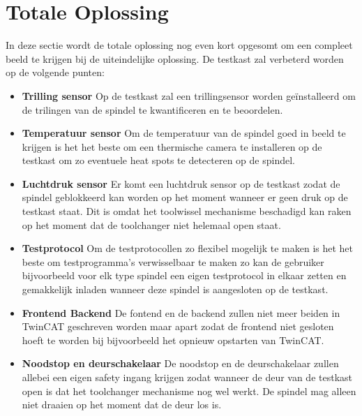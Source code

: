 \section{Totale Oplossing}

In deze sectie wordt de totale oplossing nog even kort opgesomt om een compleet beeld te krijgen bij de uiteindelijke oplossing. De testkast zal verbeterd worden op de volgende punten:

\begin{itemize}
	\item \textbf{Trilling sensor} Op de testkast zal een trillingsensor worden geïnstalleerd om de trilingen van de spindel te kwantificeren en te beoordelen.
	
	\item \textbf{Temperatuur sensor} Om de temperatuur van de spindel goed in beeld te krijgen is het het beste om een thermische camera te installeren op de testkast om zo eventuele heat spots te detecteren op de spindel.
	
	\item \textbf{Luchtdruk sensor} Er komt een luchtdruk sensor op de testkast zodat de spindel geblokkeerd kan worden op het moment wanneer er geen druk op de testkast staat. Dit is omdat het toolwissel mechanisme beschadigd kan raken op het moment dat de toolchanger niet helemaal open staat.
	
	\item \textbf{Testprotocol} Om de testprotocollen zo flexibel mogelijk te maken is het het beste om testprogramma's verwisselbaar te maken zo kan de gebruiker bijvoorbeeld voor elk type spindel een eigen testprotocol in elkaar zetten en gemakkelijk inladen wanneer deze spindel is aangesloten op de testkast.
	
	\item \textbf{Frontend Backend} De fontend en de backend zullen niet meer beiden in TwinCAT geschreven worden maar apart zodat de frontend niet gesloten hoeft te worden bij bijvoorbeeld het opnieuw opstarten van TwinCAT.
	
	\item \textbf{Noodstop en deurschakelaar} De noodstop en de deurschakelaar zullen allebei een eigen safety ingang krijgen zodat wanneer de deur van de testkast open is dat het toolchanger mechanisme nog wel werkt. De spindel mag alleen niet draaien op het moment dat de deur los is.
\end{itemize}
	